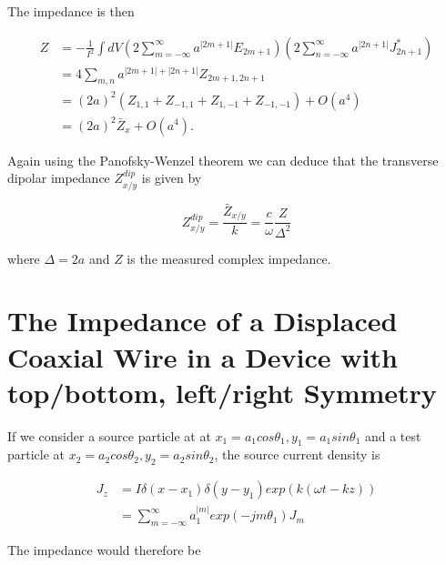 \documentclass[review, number, sort&compress]{elsarticle}
\begin{document}
The impedance is then

\begin{align}
Z & =  - \frac{1}{I^{2}} \int dV \left( 2\displaystyle\sum\limits_{m=-\infty}^{\infty} a^{|2m + 1 |} E_{2m + 1}  \right)  \left( 2\displaystyle\sum\limits_{n=-\infty}^{\infty} a^{|2n + 1 |} J_{2n + 1}^{*}  \right) \nonumber \\
& =  4 \displaystyle\sum\limits_{m,n} a^{|2m + 1 | + |2n + 1|} Z_{2m + 1, 2n+1} \nonumber \\
& =  \left(2a \right)^{2}\left( Z_{1,1} + Z_{-1,1} + Z_{1,-1} + Z_{-1,-1} \right) + O(a^{4}) \nonumber \\
& =  (2a)^{2}\bar{Z}_{x} + O(a^{4}). 
\end{align}

Again using the Panofsky-Wenzel theorem we can deduce that the transverse dipolar impedance $Z^{dip}_{x/y}$ is given by 

\begin{equation}
Z^{dip}_{x/y} = \frac{\bar{Z}_{x/y}}{k} = \frac{c}{\omega} \frac{Z}{\Delta^{2}}
\end{equation}

where $\Delta = 2a$ and $Z$ is the measured complex impedance.

\section{The Impedance of a Displaced Coaxial Wire in a Device with top/bottom, left/right Symmetry}
\label{sec:TopBotSymMath}

If we consider a source particle at at $x_{1} = a_{1}cos\theta_{1}, y_{1} = a_{1}sin\theta_{1}$ and a test particle at $x_{2} = a_{2}cos\theta_{2}, y_{2} = a_{2}sin\theta_{2}$, the source current density is

\begin{align}
J_{z} &= I\delta \left( x-x_{1} \right) \delta \left( y-y_{1} \right) exp \left( k \left( \omega t - kz \right) \right) \nonumber \\
          &=\displaystyle\sum\limits_{m=-\infty}^{\infty}a_{1}^{|m|}exp\left( -jm\theta_{1} \right) J_{m}
\end{align}

The impedance would therefore be
\end{document}
